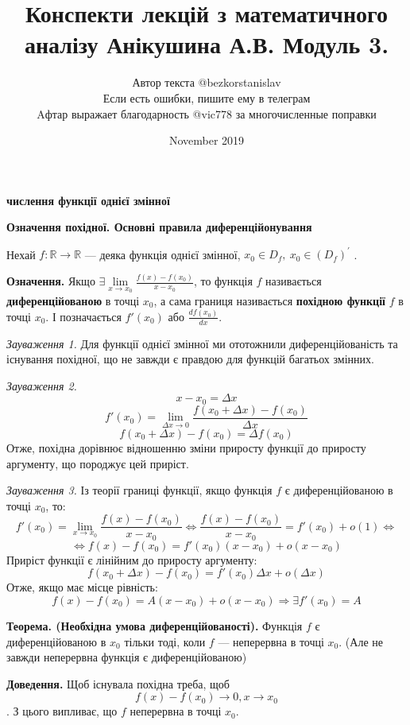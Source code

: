 \documentclass[12pt]{report}
\title{Конспекти лекцій з математичного аналізу Анікушина А.В. Модуль 3.}
\author{Автор текста @bezkorstanislav \\ Если есть ошибки, пишите ему в телеграм \\  \small{Aфтар выражает благодарность @vic778 за многочисленные поправки}}
\date{November 2019}
\begin{document}
\maketitle

\begin{center}
\textbf{ числення функції однієї змінної}
\end{center}

\begin{center}
\textbf{\large{Означення похідної. Основні правила диференційонування}}
\end{center}

Нехай $f : \mathbb{R} \to \mathbb{R}$ --- деяка функція однієї змінної, $x_0 \in D_f,\ x_0 \in (D_f)^{'}$ .

\textbf{Означення.} Якщо $\exists \lim\limits_{x \to x_0} \frac{f(x) - f(x_0)}{x - x_0}$, то функція $f$ називається 
\textbf{диференційованою} в точці $x_0$, а сама границя називається \textbf{похідною функції} $f$ в точці $x_0$. І позначається $f'(x_0)$ або $\frac{d f(x_0)}{d x}$.

\vspace{3mm}

\textit{Зауваження 1.} Для функції однієї змінної ми ототожнили диференційованість та існування похідної, що не завжди є правдою для функцій багатьох змінних.

\textit{Зауваження 2.} $$x - x_0 = \Delta x$$
$$f'(x_0) = \lim_{\Delta x \to 0} \frac{f(x_0 + \Delta x) - f(x_0)}{\Delta x}$$
$$f(x_0 + \Delta x) - f(x_0) = \Delta f(x_0)$$
Отже, похідна дорівнює відношенню зміни приросту функції до приросту аргументу, що породжує цей приріст.

\textit{Зауваження 3.} Із теорії границі функції, якщо функція $f$ є диференційованою в точці $x_0$, то:
$$f'(x_0) = \lim_{x \to x_0} \frac{f(x) - f(x_0)}{x - x_0} \Longleftrightarrow \frac{f(x) - f(x_0)}{x - x_0} = f'(x_0) + o(1) \Longleftrightarrow$$
$$\Longleftrightarrow f(x) - f(x_0) = f'(x_0)(x-x_0) + o(x-x_0)$$
Приріст функції є лінійним до приросту аргументу:
$$f(x_0 + \Delta x) - f(x_0) = f'(x_0)\Delta x + o(\Delta x)$$ 
Отже, якщо має місце рівність:
$$f(x) - f(x_0) = A (x - x_0) + o(x - x_0) \Longrightarrow \exists f'(x_0) = A$$

\textbf{Теорема. (Необхідна умова диференційованості).} Функція $f$ є диференційованою в $x_0$ тільки тоді, коли $f$ --- неперервна в точці $x_0$. (Але не завжди неперервна функція є диференційованою)

\textbf{Доведення.} Щоб існувала похідна треба, щоб
$$f(x) - f(x_0) \to 0, x \to x_0$$.
З цього випливає, що $f$ неперервна в точці $x_0$.
\end{document}
